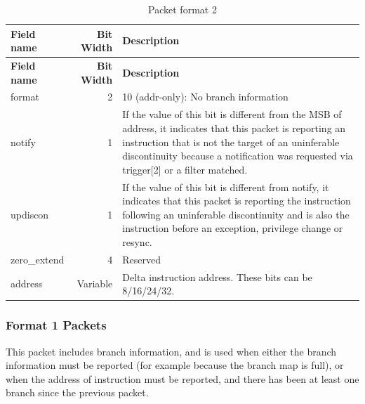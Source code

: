\documentclass[main\_\_EN.tex]{subfiles}
\begin{document}
\begin{longtable}[c]{ |l|r|L{10cm}| }
    \caption{Packet format 2}
    \label{tab:f2}
    \\\hline{}
    \textbf{Field name} & \textbf{Bit Width} & \textbf{Description} \\\hline
    \endfirsthead
    \hline{}
    \textbf{Field name} & \textbf{Bit Width} & \textbf{Description} \\\hline
    \endhead
    \endfoot
    \endlastfoot

    format & 2 & 10 (addr-only): No branch information \\\hline
    notify & 1 & If the value of this bit is different from the MSB of address, it indicates that this packet is reporting an instruction that is not the target of an uninferable discontinuity because a notification was requested via trigger[2] or a filter matched. \\\hline
    updiscon & 1 & If the value of this bit is different from notify, it indicates that this packet is reporting the instruction following an uninferable discontinuity and is also the instruction before an exception, privilege change or resync. \\\hline
    zero\_extend & 4 & Reserved \\\hline
    address & Variable & Delta instruction address. These bits can be 8/16/24/32. \\\hline

 \end{longtable}


\subsubsection{Format 1 Packets}

This packet includes branch information, and is used when either the branch information must be reported (for example because the branch map is full), or when the address of instruction must be reported, and there has been at least one branch since the previous packet.
\end{document}
